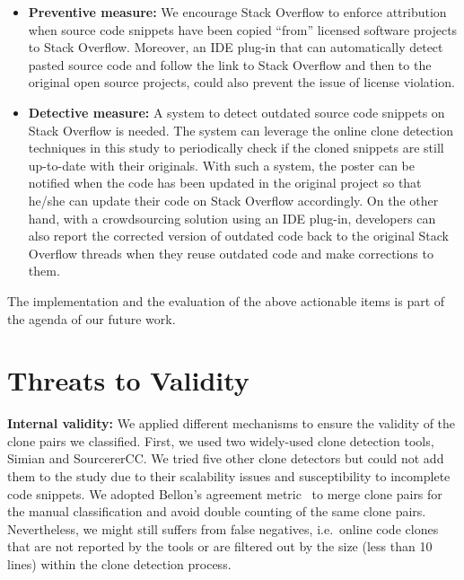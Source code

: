 \documentclass[10pt,journal,compsoc]{IEEEtran}
\begin{document}
\begin{itemize} 
	\item \textbf{Preventive measure:} We
	encourage Stack Overflow to enforce attribution when source code snippets have
	been copied ``from'' licensed software projects to Stack Overflow. Moreover, an
	IDE plug-in that can automatically detect pasted source code and follow the link
	to Stack Overflow and then to the original open source projects, could also
	prevent the issue of license violation. 
	\item \textbf{Detective measure:} A
	system to detect outdated source code snippets on Stack Overflow is needed. The
	system can leverage the online clone detection techniques in this study to
	periodically check if the cloned snippets are still up-to-date with their
	originals. %
	With such a system, the poster can be notified when the code has been updated
	in the original project so that he/she can update their code on Stack Overflow
	accordingly. On the other hand, with a crowdsourcing solution using an IDE
	plug-in, developers can also report the corrected version of outdated code back
	to the original Stack Overflow threads when they reuse outdated code and make
	corrections to them. 
\end{itemize} 

The implementation and the evaluation of the
above actionable items is part of the agenda of our future work.

\section{Threats to Validity}

\textbf{Internal validity:} 
We applied
different mechanisms to ensure the validity of the clone
pairs we classified.  First, we used two widely-used
clone detection tools, Simian and SourcererCC.  We tried five other
clone detectors but could not add them to the study due to their
scalability issues and susceptibility to incomplete code snippets.
We adopted Bellon's agreement metric~\cite{Bellon2007}
to merge clone pairs for the manual
classification and avoid double counting of the same clone pairs. 
Nevertheless, we might still suffers from false negatives, i.e.~online 
code clones that are not reported by the tools or are filtered 
out by the size (less than 10 lines) within the clone detection process.
\end{document}
